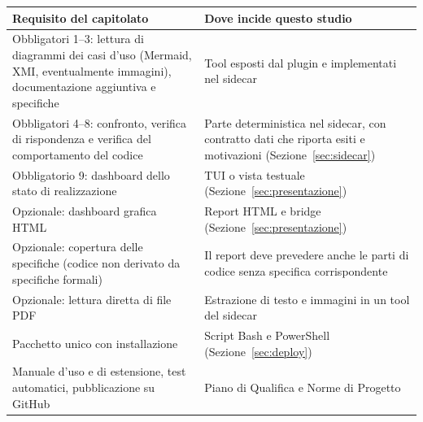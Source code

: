 \documentclass[a4paper, 11pt]{article}
\begin{document}
\vspace{0.3cm}
\noindent
\begin{tabularx}{\textwidth}{|X|X|}
    \hline
    \textbf{Requisito del capitolato} & \textbf{Dove incide questo studio} \\ \hline
    Obbligatori 1--3: lettura di diagrammi dei casi d'uso (Mermaid, XMI, eventualmente immagini), documentazione aggiuntiva e specifiche & Tool esposti dal plugin e implementati nel sidecar \\ \hline
    Obbligatori 4--8: confronto, verifica di rispondenza e verifica del comportamento del codice & Parte deterministica nel sidecar, con contratto dati che riporta esiti e motivazioni (Sezione~\ref{sec:sidecar}) \\ \hline
    Obbligatorio 9: dashboard dello stato di realizzazione & TUI o vista testuale (Sezione~\ref{sec:presentazione}) \\ \hline
    Opzionale: dashboard grafica HTML & Report HTML e bridge (Sezione~\ref{sec:presentazione}) \\ \hline
    Opzionale: copertura delle specifiche (codice non derivato da specifiche formali) & Il report deve prevedere anche le parti di codice senza specifica corrispondente \\ \hline
    Opzionale: lettura diretta di file PDF & Estrazione di testo e immagini in un tool del sidecar \\ \hline
    Pacchetto unico con installazione & Script Bash e PowerShell (Sezione~\ref{sec:deploy}) \\ \hline
    Manuale d'uso e di estensione, test automatici, pubblicazione su GitHub & Piano di Qualifica e Norme di Progetto \\ \hline
\end{tabularx}
\vspace{0.3cm}
\end{document}

